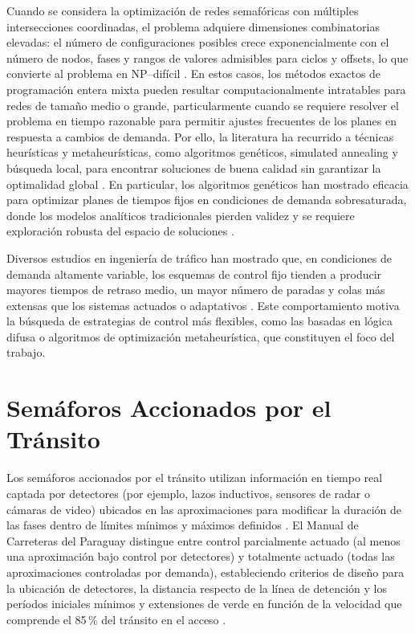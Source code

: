 Cuando se considera la optimización de redes semafóricas con múltiples intersecciones coordinadas, el problema adquiere dimensiones combinatorias elevadas: el número de configuraciones posibles crece exponencialmente con el número de nodos, fases y rangos de valores admisibles para ciclos y offsets, lo que convierte al problema en NP--difícil \cite{gartner1975multiband,wong1998optimizing}. En estos casos, los métodos exactos de programación entera mixta pueden resultar computacionalmente intratables para redes de tamaño medio o grande, particularmente cuando se requiere resolver el problema en tiempo razonable para permitir ajustes frecuentes de los planes en respuesta a cambios de demanda. Por ello, la literatura ha recurrido a técnicas heurísticas y metaheurísticas, como algoritmos genéticos, simulated annealing y búsqueda local, para encontrar soluciones de buena calidad sin garantizar la optimalidad global \cite{park1999genetic,ceylan2004traffic}. En particular, los algoritmos genéticos han mostrado eficacia para optimizar planes de tiempos fijos en condiciones de demanda sobresaturada, donde los modelos analíticos tradicionales pierden validez y se requiere exploración robusta del espacio de soluciones \cite{park1999genetic}.

Diversos estudios en ingeniería de tráfico han mostrado que, en condiciones de demanda altamente variable, los esquemas de control fijo tienden a producir mayores tiempos de retraso medio, un mayor número de paradas y colas más extensas que los sistemas actuados o adaptativos \cite{papageorgiou2003review,stevanovic2010adaptive}. Este comportamiento motiva la búsqueda de estrategias de control más flexibles, como las basadas en lógica difusa o algoritmos de optimización metaheurística, que constituyen el foco del trabajo.




\section{Semáforos Accionados por el Tránsito}
\label{subsec:semaforos_accionados_transito}

Los semáforos accionados por el tránsito utilizan información en tiempo real captada por detectores (por ejemplo, lazos inductivos, sensores de radar o cámaras de video) ubicados en las aproximaciones para modificar la duración de las fases dentro de límites mínimos y máximos definidos \cite{mopc2019manual}. El Manual de Carreteras del Paraguay distingue entre control parcialmente actuado (al menos una aproximación bajo control por detectores) y totalmente actuado (todas las aproximaciones controladas por demanda), estableciendo criterios de diseño para la ubicación de detectores, la distancia respecto de la línea de detención y los períodos iniciales mínimos y extensiones de verde en función de la velocidad que comprende el 85\,\% del tránsito en el acceso \cite{mopc2019manual}.

